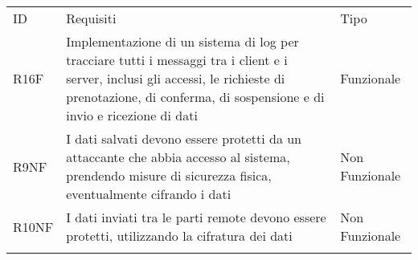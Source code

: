 \begin{longtable}[c]{@{}lll@{}}
\toprule\addlinespace
ID & Requisiti & Tipo
\\\addlinespace
\midrule\endhead
R16F & Implementazione di un sistema di log per tracciare tutti i
messaggi tra i client e i server, inclusi gli accessi, le richieste di
prenotazione, di conferma, di sospensione e di invio e ricezione di dati
& Funzionale
\\\addlinespace
R9NF & I dati salvati devono essere protetti da un attaccante che abbia
accesso al sistema, prendendo misure di sicurezza fisica, eventualmente
cifrando i dati & Non Funzionale
\\\addlinespace
R10NF & I dati inviati tra le parti remote devono essere protetti,
utilizzando la cifratura dei dati & Non Funzionale
\\\addlinespace
\bottomrule
\end{longtable}
